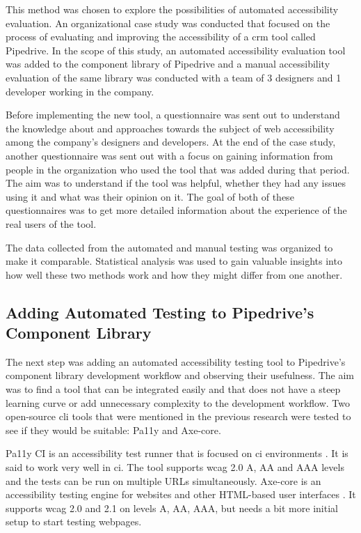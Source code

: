 \documentclass{master_thesis}
\begin{document}
This method was chosen to explore the possibilities of automated accessibility evaluation. An organizational case study was conducted that focused on the process of evaluating and improving the accessibility of a \ac{crm} tool called Pipedrive. In the scope of this study, an automated accessibility evaluation tool was added to the component library of Pipedrive and a manual accessibility evaluation of the same library was conducted with a team of 3 designers and 1 developer working in the company.

Before implementing the new tool, a questionnaire was sent out to understand the knowledge about and approaches towards the subject of web accessibility among the company's designers and developers. At the end of the case study, another questionnaire was sent out with a focus on gaining information from people in the organization who used the tool that was added during that period. The aim was to understand if the tool was helpful, whether they had any issues using it and what was their opinion on it. The goal of both of these questionnaires was to get more detailed information about the experience of the real users of the tool.

The data collected from the automated and manual testing was organized to make it comparable. Statistical analysis was used to gain valuable insights into how well these two methods work and how they might differ from one another.

\subsection{Adding Automated Testing to Pipedrive's Component Library} \label{adding-a11y-tool}

The next step was adding an automated accessibility testing tool to Pipedrive's component library development workflow and observing their usefulness. The aim was to find a tool that can be integrated easily and that does not have a steep learning curve or add unnecessary complexity to the development workflow. Two open-source \ac{cli} tools that were mentioned in the previous research were tested to see if they would be suitable: Pa11y and Axe-core.

Pa11y CI is an accessibility test runner that is focused on \ac{ci} environments \citep{TeamPa11y2022}. It is said to work very well in \ac{ci}. The tool supports \ac{wcag} 2.0 A, AA and AAA levels and the tests can be run on multiple URLs simultaneously. Axe-core is an accessibility testing engine for websites and other HTML-based user interfaces \citep{Deque2023}. It supports \ac{wcag} 2.0 and 2.1 on levels A, AA, AAA, but needs a bit more initial setup to start testing webpages.
\end{document}
